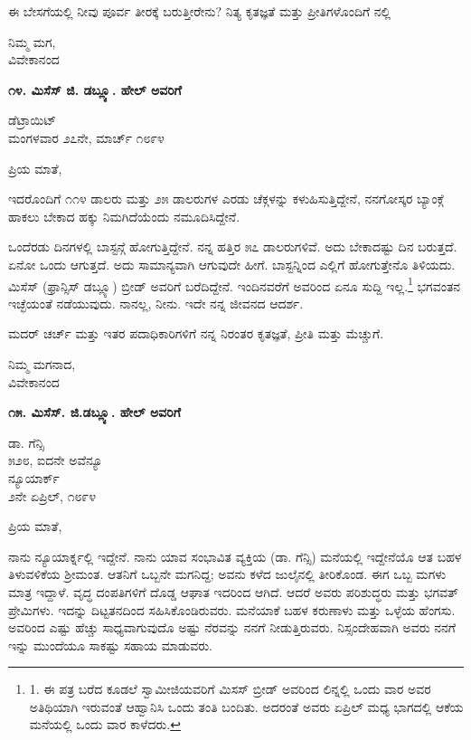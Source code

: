 ಈ ಬೇಸಗೆಯಲ್ಲಿ ನೀವು ಪೂರ್ವ ತೀರಕ್ಕೆ ಬರುತ್ತೀರೇನು? ನಿತ್ಯ ಕೃತಜ್ಞತೆ ಮತ್ತು ಪ್ರೀತಿಗಳೊಂದಿಗೆ
‌ನಲ್ಲಿ
\begin{flushright}
ನಿಮ್ಮ ಮಗ,\\ವಿವೇಕಾನಂದ
\end{flushright}

\begin{center}
\textbf{೧೪. ಮಿಸೆಸ್ ಜಿ. ಡಬ್ಲ್ಯೂ. ಹೇಲ್ ಅವರಿಗೆ}
\end{center}

\begin{flushright}
ಡೆಟ್ರಾಯಿಟ್\\ಮಂಗಳವಾರ ೨೭ನೇ, ಮಾರ್ಚ್ ೧೮೯೪
\end{flushright}

ಪ್ರಿಯ ಮಾತೆ,

ಇದರೊಂದಿಗೆ ೧೧೪ ಡಾಲರು ಮತ್ತು ೨೫ ಡಾಲರುಗಳ ಎರಡು ಚೆಕ್ಗಳನ್ನು ಕಳುಹಿಸುತ್ತಿದ್ದೇನೆ, ನನಗೋಸ್ಕರ ಬ್ಯಾಂಕ್ಗೆ ಹಾಕಲು ಬೇಕಾದ ಹಕ್ಕು ನಿಮಗಿದೆಯೆಂದು ನಮೂದಿಸಿದ್ದೇನೆ.

ಒಂದೆರಡು ದಿನಗಳಲ್ಲಿ ಬಾಸ್ಟನ್ಗೆ ಹೋಗುತ್ತಿದ್ದೇನೆ. ನನ್ನ ಹತ್ತಿರ ೫೭ ಡಾಲರುಗಳಿವೆ. ಅದು ಬೇಕಾದಷ್ಟು ದಿನ ಬರುತ್ತದೆ. ಏನೋ ಒಂದು ಆಗುತ್ತದೆ. ಅದು ಸಾಮಾನ್ಯವಾಗಿ ಆಗುವುದೇ ಹೀಗೆ. ಬಾಸ್ಟನ್ನಿಂದ ಎಲ್ಲಿಗೆ ಹೋಗುತ್ತೇನೊ ತಿಳಿಯದು. ಮಿಸೆಸ್ (ಫ್ರಾನ್ಸಿಸ್ ಡಬ್ಲ್ಯೂ) ಬ್ರೀಡ್ ಅವರಿಗೆ ಬರೆದಿದ್ದೇನೆ. ಇಂದಿನವರೆಗೆ ಅವರಿಂದ ಏನೂ ಸುದ್ದಿ ಇಲ್ಲ.\footnote{1. ಈ ಪತ್ರ ಬರೆದ ಕೂಡಲೆ ಸ್ವಾಮೀಜಿಯವರಿಗೆ ಮಿಸಸ್ ಬ್ರೀಡ್ ಅವರಿಂದ ಲಿನ್ನಲ್ಲಿ ಒಂದು ವಾರ ಅವರ ಅತಿಥಿಯಾಗಿ ಇರುವಂತೆ ಆಹ್ವಾನಿಸಿ ಒಂದು ತಂತಿ ಬಂದಿತು. ಅದರಂತೆ ಅವರು ಏಪ್ರಿಲ್ ಮಧ್ಯ ಭಾಗದಲ್ಲಿ ಆಕೆಯ ಮನೆಯಲ್ಲಿ ಒಂದು ವಾರ ಕಾಳೆದರು.} ಭಗವಂತನ ಇಚ್ಛೆಯಂತೆ ನಡೆಯುವುದು. ನಾನಲ್ಲ, ನೀನು. ಇದೇ ನನ್ನ ಜೀವನದ ಆದರ್ಶ.

ಮದರ್ ಚರ್ಚ್ ಮತ್ತು ಇತರ ಪದಾಧಿಕಾರಿಗಳಿಗೆ ನನ್ನ ನಿರಂತರ ಕೃತಜ್ಞತೆ, ಪ್ರೀತಿ ಮತ್ತು ಮೆಚ್ಚುಗೆ.

\begin{flushright}
ನಿಮ್ಮ ಮಗನಾದ,\\ವಿವೇಕಾನಂದ
\end{flushright}

\begin{center}
\textbf{೧೫. ಮಿಸೆಸ್. ಜಿ.ಡಬ್ಲ್ಯೂ. ಹೇಲ್ ಅವರಿಗೆ}
\end{center}

\begin{flushright}
 ಡಾ. ಗೆನ್ಸಿ\\೫೨೮, ಐದನೇ ಅವೆನ್ಯೂ\\ನ್ಯೂಯಾರ್ಕ್\\೨ನೇ ಏಪ್ರಿಲ್, ೧೮೯೪
\end{flushright}

ಪ್ರಿಯ ಮಾತೆ,

ನಾನು ನ್ಯೂಯಾರ್ಕ್ನಲ್ಲಿ ಇದ್ದೇನೆ. ನಾನು ಯಾವ ಸಂಭಾವಿತ ವ್ಯಕ್ತಿಯ (ಡಾ. ಗೆನ್ಸಿ) ಮನೆಯಲ್ಲಿ ಇದ್ದೇನೆಯೊ ಆತ ಬಹಳ ತಿಳುವಳಿಕೆಯ ಶ‍್ರೀಮಂತ. ಆತನಿಗೆ ಒಬ್ಬನೇ ಮಗನಿದ್ದ; ಅವನು ಕಳೆದ ಜುಲೈನಲ್ಲಿ ತೀರಿಕೊಂಡ. ಈಗ ಒಬ್ಬ ಮಗಳು ಮಾತ್ರ ಇದ್ದಾಳೆ. ವೃದ್ಧ ದಂಪತಿಗಳಿಗೆ ದೊಡ್ಡ ಆಘಾತ ಇದರಿಂದ ಆಗಿದೆ. ಆದರೆ ಅವರು ಪರಿಶುದ್ಧರು ಮತ್ತು ಭಗವತ್ ಪ್ರೇಮಿಗಳು. ಇದನ್ನು ದಿಟ್ಟತನದಿಂದ ಸಹಿಸಿಕೊಂಡಿರುವರು. ಮನೆಯಾಕೆ ಬಹಳ ಕರುಣಾಳು ಮತ್ತು ಒಳ್ಳೆಯ ಹೆಂಗಸು. ಅವರಿಂದ ಎಷ್ಟು ಹೆಚ್ಚು ಸಾಧ್ಯವಾಗುವುದೊ ಅಷ್ಟು ನೆರವನ್ನು ನನಗೆ ನೀಡುತ್ತಿರುವರು. ನಿಸ್ಸಂದೇಹವಾಗಿ ಅವರು ನನಗೆ ಇನ್ನು ಮುಂದೆಯೂ ಸಾಕಷ್ಟು ಸಹಾಯ ಮಾಡುವರು.

